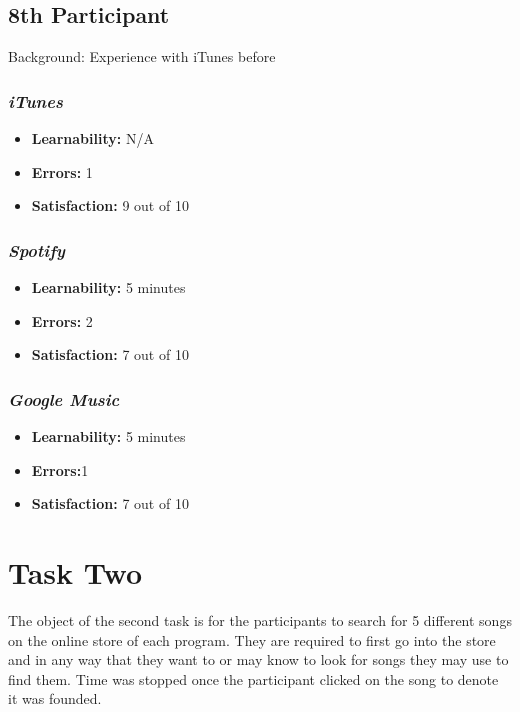 \documentclass{article}
\begin{document}
{\begin{multicols}{2}
\subsection{8th Participant}
Background: Experience with iTunes before

\subsubsection{\it iTunes}
\begin{itemize}
	\item {\bf Learnability:} N/A
	\item {\bf Errors:} 1
	\item {\bf Satisfaction:} 9 out of 10 
\end{itemize}

\subsubsection{\it Spotify}
\begin{itemize}
	\item {\bf Learnability:} 5 minutes
	\item {\bf Errors:} 2
	\item {\bf Satisfaction:} 7 out of 10 
\end{itemize}

\subsubsection{\it Google Music}
\begin{itemize}
\item {\bf Learnability:} 5 minutes
	\item {\bf Errors:}1
	\item {\bf Satisfaction:} 7 out of 10 
\end{itemize} 
\end{multicols}

\section{Task Two}
The object of the second task is for the participants to search for 5 different songs on the online store of each program. They are required to first go into the store and in any way that they want to or may know to look for songs they may use to find them. Time was stopped once the participant clicked on the song to denote it was founded. 

\begin{multicols}{2}

\end{multicols}}
\end{document}
